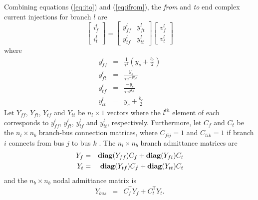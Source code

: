 Combining equations (\ref{eq:ito}) and (\ref{eq:ifrom}), the \textit{from} and
\textit{to} end complex current injections for branch $l$ are
\begin{equation}
\label{eq:ybranch}
\begin{bmatrix}
i_f^l\\
i_t^l
\end{bmatrix}
=
\begin{bmatrix}
y_{ff}^l& y_{ft}^l\\
y_{tf}^l& y_{tt}^l
\end{bmatrix}
\begin{bmatrix}
v_f^l\\
v_t^l
\end{bmatrix}
\end{equation}
where
\begin{eqnarray}
\label{eq:yff}
y_{ff}^l& =& \frac{1}{\tau^2} \left(y_s + \frac{b_c}{2}\right)\\
\label{eq:yft}
y_{ft}^l& =& \frac{y_s}{\tau e^{-j\theta_{ph}}}\\
\label{eq:ytf}
y_{tf}^l& =& \frac{-y_s}{\tau e^{j\theta_{ph}}}\\
\label{eq:ytt}
y_{tt}^l& =& y_s + \frac{b_c}{2}
\end{eqnarray}
Let $Y_{ff}$, $Y_{ft}$, $Y_{tf}$ and $Y_{tt}$ be $n_l \times 1$ vectors where
the $l^{th}$ element of each corresponds to $y_{ff}^l$, $y_{ft}^l$,
$y_{tf}^l$ and $y_{tt}^l$, respectively.  Furthermore, let $C_f$ and $C_t$ be the
$n_l \times n_b$ branch-bus connection matrices, where $C_{fij} = 1$ and
$C_{tik} = 1$ if branch $i$ connects from bus $j$ to bus $k$
\cite[p.12]{pserc:mp_manual}.  The $n_l \times n_b$ branch admittance matrices
are
\begin{eqnarray}
Y_f& =& \mathop{\mathbf{diag}}(Y_{ff})C_f + \mathop{\mathbf{diag}}(Y_{ft})C_t\\
Y_t& =& \mathop{\mathbf{diag}}(Y_{tf})C_f + \mathop{\mathbf{diag}}(Y_{tt})C_t
\end{eqnarray}
and the
$n_b \times n_b$ nodal admittance matrix is
\begin{eqnarray}
Y_{bus}& =& C_f^\mathsf{T} Y_f + C_t^\mathsf{T} Y_t .
\end{eqnarray}


